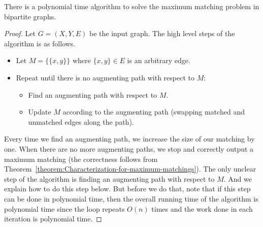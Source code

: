 \begin{flex}
\begin{theorem} \label{theorem:Finding-a-maximum-matching-in-bipartite-graphs}
There is a polynomial time algorithm to solve the maximum matching problem in bipartite graphs.
\end{theorem}

\begin{proof}
Let $G=(X,Y,E)$ be the input graph. The high level steps of the algorithm is as follows.
\begin{itemize}
    \item Let $M = \{ \{x,y\} \}$ where $\{x,y\} \in E$ is an arbitrary edge.
    \item Repeat until there is no augmenting path with respect to $M$:
    \begin{itemize}
        \item Find an augmenting path with respect to $M$.
        \item Update $M$ according to the augmenting path (swapping matched and unmatched edges along the path).
    \end{itemize}
\end{itemize}
Every time we find an augmenting path, we increase the size of our matching by one. When there are no more augmenting paths, we stop and correctly output a maximum matching (the correctness follows from Theorem~\ref{theorem:Characterization-for-maximum-matchings}). The only unclear step of the algorithm is finding an augmenting path with respect to $M$. And we explain how to do this step below. But before we do that, note that if this step can be done in polynomial time, then the overall running time of the algorithm is polynomial time since the loop repeats $O(n)$ times and the work done in each iteration is polynomial time. 


\end{proof}
\end{flex}
